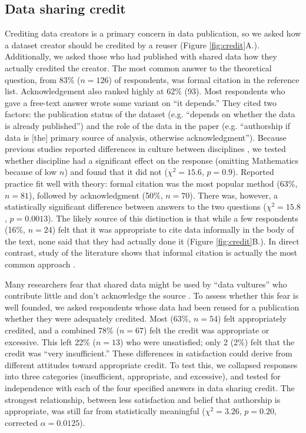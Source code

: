 \documentclass[10pt]{article}
\begin{document}
\subsection*{Data sharing credit}

Crediting data creators is a primary concern in data publication, so we asked how a dataset creator should be credited by a reuser (Figure \ref{fig:credit}A.).
Additionally, we asked those who had published with shared data how they actually credited the creator.
The most common answer to the theoretical question, from 83\% ($n=126$) of respondents, was formal citation in the reference list.
Acknowledgement also ranked highly at 62\% (93).
Most respondents who gave a free-text answer wrote some variant on ``it depends.''
They cited two factors: the publication status of the dataset (e.g. ``depends on whether the data is already published'') and the role of the data in the paper (e.g. ``authorship if data is [the] primary source of analysis, otherwise acknowledgment'').
Because previous studies reported differences in culture between disciplines \cite{swan_share_2008, harley_assessing_2010, tenopir_data_2011}, we tested whether discipline had a significant effect on the response  (omitting Mathematics because of low $n$) and found that it did not ($\chi^{2}=15.6$, $p=0.9$).
Reported practice fit well with theory: formal citation was the most popular method (63\%, $n=81$), followed by acknowledgment (50\%, $n=70$).
There was, however, a statistically significant difference between answers to the two questions ($\chi^{2}=15.8$, $p=0.0013$).
The likely source of this distinction is that while a few respondents (16\%, $n=24$) felt that it was appropriate to cite data informally in the body of the text, none said that they had actually done it (Figure \ref{fig:credit}B.).
In direct contrast, study of the literature shows that informal citation is actually the most common approach \cite{sieber_not_1995, mooney_anatomy_2012}.

Many researchers fear that shared data might be used by ``data vultures'' who contribute little and don't acknowledge the source \cite{kim_institutional_2012}.
To assess whether this fear is well founded, we asked respondents whose data had been reused for a publication whether they were adequately credited.
Most (63\%, $n=54$) felt appropriately credited, and a combined 78\% ($n=67$) felt the credit was appropriate or excessive.
This left 22\% ($n=13$) who were unsatisfied; only 2 (2\%) felt that the credit was ``very insufficient.''
These differences in satisfaction could derive from different attitudes toward appropriate credit.  
To test this, we collapsed responses into three categories (insufficient, appropriate, and excessive), and tested for independence with each of the four specified answers in data sharing credit.
The strongest relationship, between less satisfaction and belief that authorship is appropriate, was still far from statistically meaningful ($\chi^{2}= 3.26$, $p= 0.20$, corrected $\alpha= 0.0125$).
\end{document}
